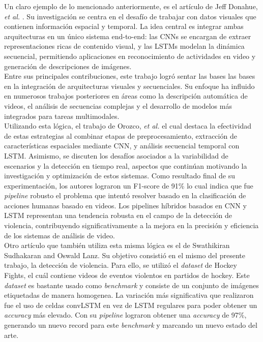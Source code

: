 Un claro ejemplo de lo mencionado anteriormente, 
es el artículo de Jeff Donahue, \textit{et al.}
\cite{Donahue2016}. Su investigación se centra en el 
desafío de trabajar con datos visuales que contienen 
información espacial y temporal. La idea central es 
integrar ambas arquitecturas en un único sistema 
end-to-end: las CNNs se encargan de extraer 
representaciones ricas de contenido visual, y las 
LSTMs modelan la dinámica secuencial, permitiendo 
aplicaciones en reconocimiento de actividades en video y 
generación de descripciones de imágenes. \\

Entre sus principales contribuciones, este trabajo 
logró sentar las bases las bases en la integración de 
arquitecturas visuales y secuenciales. Su enfoque ha 
influido en numerosos trabajos posteriores en áreas como 
la descripción automática de videos, el análisis de 
secuencias complejas y el desarrollo de modelos más 
integrados para tareas multimodales.\\

Utilizando esta lógica, el trabajo de Orozco, \textit{et al.}\cite{Orozco2021} el cual 
destaca la efectividad de estas estrategias al combinar 
etapas de preprocesamiento, extracción de características 
espaciales mediante CNN, y análisis secuencial temporal con 
LSTM. Asimismo, se discuten los desafíos asociados a la 
variabilidad de escenarios y la detección en tiempo real, 
aspectos que continúan motivando la investigación y 
optimización de estos sistemas. Como resultado final de su 
experimentación, los autores lograron un F1-score de 91\% 
lo cual indica que fue \textit{pipeline} robusto el 
problema que intentó resolver basado en la clasificación de 
acciones humanas basado en videos. Los pipelines híbridos 
basados en CNN y LSTM representan una tendencia robusta en 
el campo de la detección de violencia, contribuyendo 
significativamente a la mejora en la precisión y eficiencia 
de los sistemas de análisis de video.\\

Otro artículo que también utiliza esta misma lógica es el de
Swathikiran Sudhakaran and Oswald Lanz\cite{Sudhakaran2017}. Su objetivo consistió 
en el mismo del presente trabajo, la detección de violencia. 
Para ello, se utilizó el \textit{dataset} de Hockey Fights, 
el cuál contiene videos de eventos violentos en partidos de 
hockey. Este \textit{dataset} es bastante usado como \textit{benchmark} 
y consiste de un conjunto de imágenes etiquetadas de manera 
homogenea. La variación más significativa que realizaron fue el 
uso de celdas convLSTM en vez de LSTM regulares para poder 
obtener un \textit{accuracy} más elevado. Con su \textit{pipeline} 
lograron obtener una \textit{accuracy} de 97\%, generando un 
nuevo record para este \textit{benchmark} y marcando un nuevo 
estado del arte. \\


